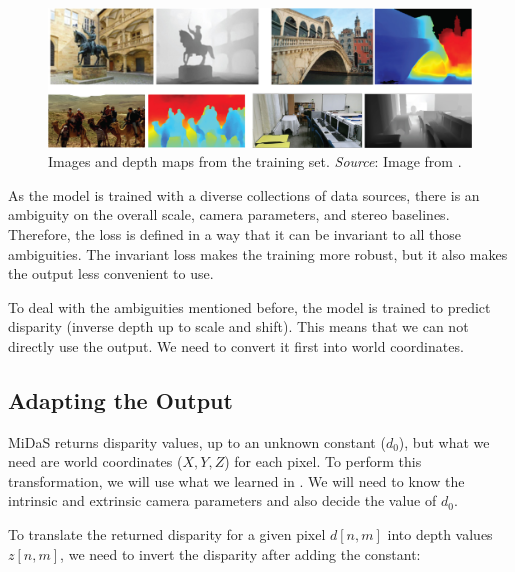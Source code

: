 \begin{figure}
    \centerline{
        \includegraphics[width=1\linewidth]{figures/simplesystem_revisited/examples_training_midas.jpg}
    }
    \caption{Images and depth maps from the training set. {\em Source}: Image from \cite{Ranftl2022}.}
    \label{fig:examples_training_midas}
\end{figure}

As the model is trained with a diverse collections of data sources, there is an ambiguity on the overall scale, camera parameters, and stereo baselines. Therefore, the loss is defined in a way that it can be invariant to all those ambiguities. The invariant loss makes the training more robust, but it also makes the output less convenient to use.

To deal with the ambiguities mentioned before, the model is trained to predict disparity (inverse depth up to scale and shift). This means that we can not directly use the output. We need to convert it first into world coordinates.

\subsection{Adapting the Output}\label{sec:simple_system_revisited:adapting_the_output}


MiDaS returns disparity values, up to an unknown constant ($d_0$), but what we need are world coordinates ($X,Y,Z$) for each pixel. To perform this transformation, we will use what we learned in \chap{\ref{sec:camera_parameters}}. We will need to know the intrinsic and extrinsic camera parameters and also decide the value of $d_0$.

To translate the returned disparity for a given pixel $d\left[n,m \right]$ into depth values $z\left[n,m \right]$, we need to invert the disparity after adding the constant:

